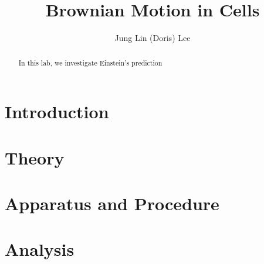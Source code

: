 \documentclass[iop,revtex4]{emulateapj_mod}
\begin{document}
\title{Brownian Motion in Cells}
\author{Jung Lin (Doris) Lee}
 \begin{abstract}
 In this lab, we investigate 
 Einstein's prediction 
 \end{abstract}
 \nocite{*}

\section{Introduction}\label{sec:intro}
\par %
\section{Theory}\label{sec:theory}
\par 
\section{Apparatus and Procedure}\label{sec:ap}
\section{Analysis}\label{sec:analysis}
\end{document}
